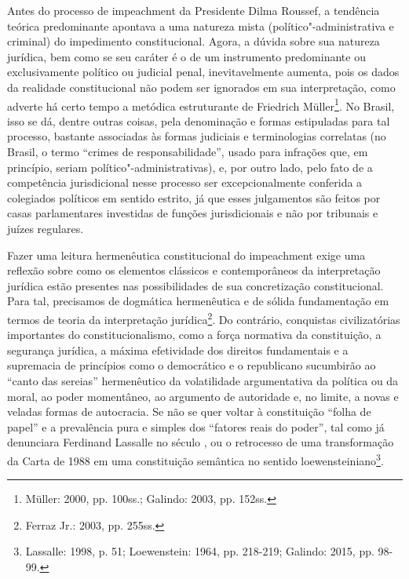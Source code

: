 Antes do processo de impeachment da Presidente Dilma Roussef, a
tendência teórica predominante apontava a uma natureza mista
(político"-administrativa e criminal) do impedimento constitucional.
Agora, a dúvida sobre sua natureza jurídica, bem como se seu caráter é o
de um instrumento predominante ou exclusivamente político ou judicial
penal, inevitavelmente aumenta, pois os dados da realidade
constitucional não podem ser ignorados em sua interpretação, como
adverte há certo tempo a metódica estruturante de Friedrich Müller\footnote{Müller: 2000, pp. 100ss.; Galindo: 2003, pp. 152ss.}. No Brasil, isso
se dá, dentre outras coisas, pela denominação e formas estipuladas para
tal processo, bastante associadas às formas judiciais e terminologias
correlatas (no Brasil, o termo ``crimes de responsabilidade'', usado
para infrações que, em princípio, seriam político"-administrativas), e,
por outro lado, pelo fato de a competência jurisdicional nesse processo
ser excepcionalmente conferida a colegiados políticos em sentido
estrito, já que esses julgamentos são feitos por casas parlamentares
investidas de funções jurisdicionais e não por tribunais e juízes
regulares.

Fazer uma leitura hermenêutica constitucional do impeachment
exige uma reflexão sobre como os elementos clássicos e contemporâneos da
interpretação jurídica estão presentes nas possibilidades de sua
concretização constitucional. Para tal, precisamos de dogmática
hermenêutica e de sólida fundamentação em termos de teoria da
interpretação jurídica\footnote{Ferraz Jr.: 2003, pp. 255ss.}. Do contrário,
conquistas civilizatórias importantes do constitucionalismo, como a
força normativa da constituição, a segurança jurídica, a máxima
efetividade dos direitos fundamentais e a supremacia de princípios como
o democrático e o republicano sucumbirão ao ``canto das sereias''
hermenêutico da volatilidade argumentativa da política ou da moral, ao
poder momentâneo, ao argumento de autoridade e, no limite, a novas e
veladas formas de autocracia. Se não se quer voltar à constituição
``folha de papel'' e a prevalência pura e simples dos ``fatores reais do
poder'', tal como já denunciara Ferdinand Lassalle no século , ou o
retrocesso de uma transformação da Carta de 1988 em uma constituição
semântica no sentido loewensteiniano\footnote{Lassalle: 1998, p. 51;
Loewenstein: 1964, pp. 218-219; Galindo: 2015, pp. 98-99.}.


